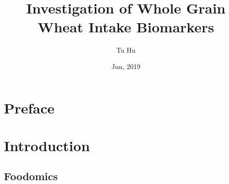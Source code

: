 \documentclass[]{article}
\title{Investigation of Whole Grain Wheat Intake Biomarkers}
\author{Tu Hu}
\subtitle{}
\date{Jun, 2019}
\begin{document}
\maketitle


\tableofcontents

\newpage
\section{Preface}


\section{Introduction}
\subsection{Foodomics}
\end{document}
